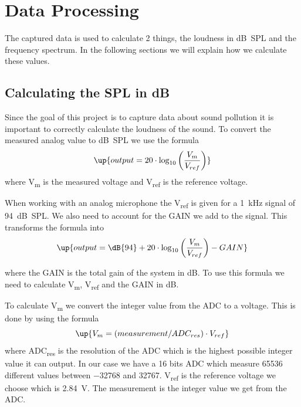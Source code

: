 \section{Data Processing}\label{sec: data processing}
  The captured data is used to calculate 2 things, the loudness in dB~SPL and the frequency spectrum. In the following sections we will explain how we calculate these values.

  \subsection{Calculating the SPL in dB}\label{ss: Calculating the SPL in dB}
    Since the goal of this project is to capture data about sound pollution it is important to correctly calculate the loudness of the sound. To convert the measured analog value to dB~SPL we use the formula
    \begin{equation}
      \label{eq: db}
      \up{  output = 20 \cdot \log_{10} \left( \frac{V_{m}}{V_{ref}} \right)}
    \end{equation}
    where V\textsubscript{m} is the measured voltage and V\textsubscript{ref} is the reference voltage.

    When working with an analog microphone the V\textsubscript{ref} is given for a 1~kHz signal of 94~dB~SPL. We also need to account for the GAIN we add to the signal. This transforms the formula into
    \begin{equation}
      \label{eq: db adjusted}
      \up{output = \dB{94} + 20 \cdot \log_{10} \left( \frac{V_{m}}{V_{ref}} \right) - GAIN}
    \end{equation}

    where the GAIN is the total gain of the system in dB. To use this formula we need to calculate V\textsubscript{m}, V\textsubscript{ref} and the GAIN in dB.

    To calculate V\textsubscript{m} we convert the integer value from the ADC to a voltage. This is done by using the formula
    \begin{equation}
      \label{eq: Vm}
      \up{V_m = (measurement / ADC_{res}) \cdot V_{ref}}
    \end{equation}
    where ADC\textsubscript{res} is the resolution of the ADC which is the highest possible integer value it can output. In our case we have a 16 bits ADC which measure 65536 different values between \num{-32768} and \num{32767}. V\textsubscript{ref} is the reference voltage we choose which is 2.84~V. The measurement is the integer value we get from the ADC.

